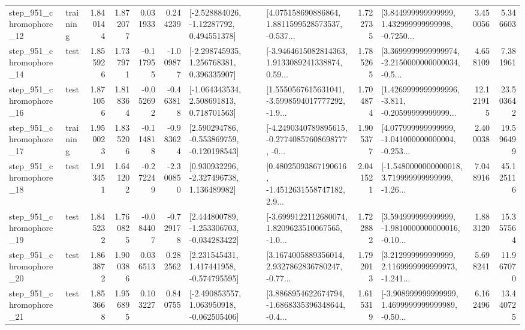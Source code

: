\begin{tabular}{llrrrrllrlrr}
  step\_951\_chromophore\_12 &  training &      1.840144 &    1.872077 &      0.031933 &  0.244239 &    [-2.528884026, -1.12287792, 0.494551378] &  [4.075158690886864, 1.8811599528573537, -0.537... &       1.722735 &  [3.844999999999999, 1.432999999999998, -0.7250... &            3.450056 &          5.346603 \\
  step\_951\_chromophore\_14 &      test &      1.855926 &    1.737971 &     -0.117955 & -1.009877 &    [-2.298745935, 1.256768381, 0.396335907] &  [-3.9464615082814363, 1.9133089241338874, 0.59... &       1.785265 &  [3.3699999999999974, -2.2150000000000034, -0.5... &            4.658109 &          7.381961 \\
  step\_951\_chromophore\_16 &      test &      1.871056 &    1.818364 &     -0.052692 & -0.463818 &    [-1.064343534, 2.508691813, 0.718701563] &  [1.5550567615631041, -3.5998594017777292, -1.9... &       1.704874 &  [1.4269999999999996, -3.811, -0.20599999999999... &           12.121915 &         23.503642 \\
  step\_951\_chromophore\_17 &  training &      1.950023 &    1.835206 &     -0.114818 & -0.983624 &   [2.590294786, -0.553869759, -0.120198543] &  [-4.2490340789895615, -0.27740857608698777, -0... &       1.905377 &  [4.077999999999999, -1.041000000000004, -0.253... &            2.400038 &         19.596499 \\
  step\_951\_chromophore\_18 &      test &      1.913451 &    1.641202 &     -0.272249 & -2.300850 &    [0.930932296, -2.327496738, 1.136489982] &  [0.48025093867190616, -1.4512631558747182, 2.9... &       2.041521 &  [-1.5480000000000018, 3.719999999999999, -1.26... &            7.048916 &         45.125116 \\
  step\_951\_chromophore\_19 &      test &      1.845232 &    1.760825 &     -0.084407 & -0.729178 &   [2.444800789, -1.253306703, -0.034283422] &  [-3.6999122112680074, 1.8209623510067565, -1.0... &       1.722882 &  [3.594999999999999, -1.9810000000000016, -0.10... &            1.883120 &         15.357564 \\
  step\_951\_chromophore\_20 &      test &      1.863872 &    1.900386 &      0.036513 &  0.282562 &    [2.231545431, 1.417441958, -0.574795595] &  [3.1674005889356014, 2.9327862836780247, -0.77... &       1.792013 &  [3.212999999999999, 2.1169999999999973, -1.241... &            5.698241 &         11.967070 \\
  step\_951\_chromophore\_21 &      test &      1.853668 &    1.956895 &      0.103227 &  0.840755 &   [-2.490853557, 1.063950918, -0.062505406] &  [3.8868954622674794, -1.6868335396348644, -0.4... &       1.615319 &  [-3.908999999999999, 1.4699999999999989, -0.50... &            6.162496 &         13.440725 \\

\end{tabular}
